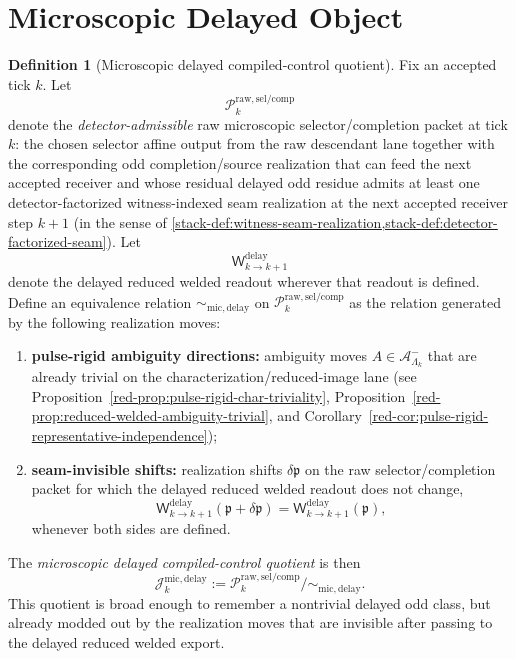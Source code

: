 \documentclass[11pt]{article}
\theoremstyle{definition}
\newtheorem{definition}{Definition}[section]
\theoremstyle{plain}
\theoremstyle{remark}
\begin{document}
\section{Microscopic Delayed Object}

\begin{definition}[Microscopic delayed compiled-control quotient]
\label{def:micro-delay-object}
Fix an accepted tick \(k\).
Let
\[
\mathcal P^{\mathrm{raw,sel/comp}}_k
\]
denote the \emph{detector-admissible} raw microscopic selector/completion packet at tick \(k\): the
chosen selector affine output from the raw descendant lane together with the corresponding odd
completion/source realization that can feed the next accepted receiver and whose residual delayed odd
residue admits at least one detector-factorized witness-indexed seam realization at the next
accepted receiver step \(k+1\)
\textup{(in the sense of \cref{stack-def:witness-seam-realization,stack-def:detector-factorized-seam})}.
Let
\[
\mathsf W^{\mathrm{delay}}_{k\to k+1}
\]
denote the delayed reduced welded readout wherever that readout is defined.
Define an equivalence relation
\(
\sim_{\mathrm{mic,delay}}
\)
on \(\mathcal P^{\mathrm{raw,sel/comp}}_k\) as the relation generated by the following realization
moves:
\begin{enumerate}[leftmargin=2em,label=(\roman*)]
\item \textbf{pulse-rigid ambiguity directions:}
  ambiguity moves \(A\in\mathcal A^-_{\Lambda_k}\) that are already trivial on the
  characterization/reduced-image lane
  \textup{(see Proposition~\ref*{red-prop:pulse-rigid-char-triviality},
  Proposition~\ref*{red-prop:reduced-welded-ambiguity-trivial}, and
  Corollary~\ref*{red-cor:pulse-rigid-representative-independence})};
\item \textbf{seam-invisible shifts:}
  realization shifts \(\delta\mathfrak p\) on the raw selector/completion packet for which the
  delayed reduced welded readout does not change,
  \[
  \mathsf W^{\mathrm{delay}}_{k\to k+1}(\mathfrak p+\delta\mathfrak p)
  =
  \mathsf W^{\mathrm{delay}}_{k\to k+1}(\mathfrak p),
  \]
  whenever both sides are defined.
\end{enumerate}
The \emph{microscopic delayed compiled-control quotient} is then
\[
\mathcal J^{\mathrm{mic,delay}}_k
:=
\mathcal P^{\mathrm{raw,sel/comp}}_k/\!\sim_{\mathrm{mic,delay}}.
\]
This quotient is broad enough to remember a nontrivial delayed odd class, but already modded out by
the realization moves that are invisible after passing to the delayed reduced welded export.
\end{definition}
\end{document}
